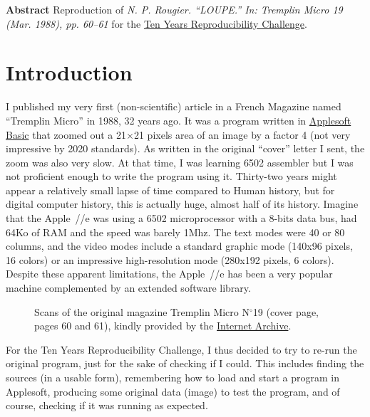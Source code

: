 \textbf{Abstract} Reproduction of {\em N. P. Rougier. “LOUPE.” In: Tremplin Micro 19 (Mar. 1988), pp. 60–61} for the \href{https://rescience.github.io/ten-years/}{Ten Years Reproducibility Challenge}.

\section*{Introduction}

I published my very first (non-scientific) article\supercite{rougier:1988} in a
French Magazine named ``Tremplin Micro'' in 1988, 32 years ago. It was a
program written
in \href{https://en.wikipedia.org/wiki/Applesoft_BASIC}{Applesoft Basic} that
zoomed out a 21$\times$21 pixels area of an image by a factor 4 (not very
impressive by 2020 standards). As written in the original ``cover'' letter I
sent, the zoom was also very slow. At that time, I was learning 6502 assembler
but I was not proficient enough to write the program using it. Thirty-two years
might appear a relatively small lapse of time compared to Human history, but
for digital computer history, this is actually huge, almost half of its
history. Imagine that the Apple~//e was using a 6502 microprocessor with a
8-bits data bus, had 64Ko of RAM and the speed was barely 1Mhz. The text modes
were 40 or 80 columns, and the video modes include a standard graphic mode
(140x96 pixels, 16 colors) or an impressive high-resolution mode (280x192
pixels, 6 colors). Despite these apparent limitations, the Apple~//e has been a
very popular machine complemented by an extended software library.
\begin{figure}
{%
\fboxsep=0pt
}
\caption{Scans of the original magazine Tremplin Micro N$^\circ$19 (cover page,
pages 60 and 61), kindly provided by the
\href{https://archive.org/details/tremplin_micro_newsletter_issue_19}{Internet
Archive}.}
\label{fig:scans}
\end{figure}
For the Ten Years Reproducibility Challenge, I thus decided to try to re-run
the original program, just for the sake of checking if I could. This includes
finding the sources (in a usable form), remembering how to load and start a
program in Applesoft, producing some original data (image) to test the program,
and of course, checking if it was running as expected.

